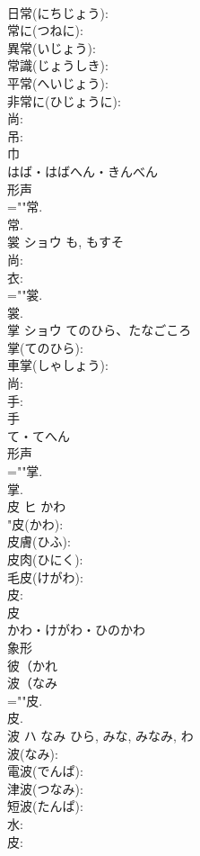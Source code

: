 \documentclass[8pt]{extreport}
\begin{document}
\begin{CJK}{UTF8}{min}
\\	日常(にちじょう): 
\\	常に(つねに): 
\\	異常(いじょう): 
\\	常識(じょうしき): 
\\	平常(へいじょう): 
\\	非常に(ひじょうに): 
\\	尚: 
\\	吊: 
\\	巾	
\\	はば・はばへん・きんべん	
\\	形声 
\\	=""常.
\\	常.
\\	裳	ショウ	も, もすそ		
\\	尚: 
\\	衣: 
\\	=""裳.
\\	裳.
\\	掌	ショウ	てのひら、たなごころ		
\\	掌(てのひら): 
\\	車掌(しゃしょう): 
\\	尚: 
\\	手: 
\\	手	
\\	て・てへん	
\\	形声 
\\	=""掌.
\\	掌.
\\	皮	ヒ	かわ		
\\	"皮(かわ): 
\\	皮膚(ひふ): 
\\	皮肉(ひにく): 
\\	毛皮(けがわ): 
\\	皮: 
\\	皮	
\\	かわ・けがわ・ひのかわ	
\\	象形 
\\	彼（かれ 
\\	波（なみ 
\\	=""皮.
\\	皮.
\\	波	ハ	なみ	ひら, みな, みなみ, わ	
\\	波(なみ): 
\\	電波(でんぱ): 
\\	津波(つなみ): 
\\	短波(たんぱ): 
\\	水: 
\\	皮: 

\end{CJK}
\end{document}
